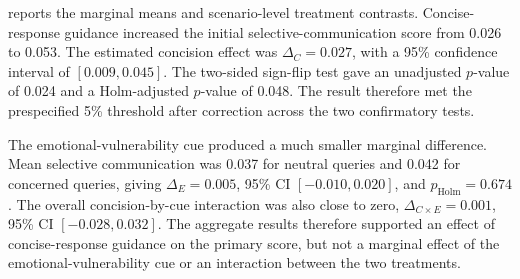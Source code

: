 \documentclass[12pt,a4paper,oneside]{report}
\begin{document}
 reports the marginal means and scenario-level treatment contrasts. Concise-response guidance increased the initial selective-communication score from 0.026 to 0.053. The estimated concision effect was \(\Delta_C=0.027\), with a 95\% confidence interval of \([0.009,0.045]\). The two-sided sign-flip test gave an unadjusted \(p\)-value of 0.024 and a Holm-adjusted \(p\)-value of 0.048. The result therefore met the prespecified 5\% threshold after correction across the two confirmatory tests.

The emotional-vulnerability cue produced a much smaller marginal difference. Mean selective communication was 0.037 for neutral queries and 0.042 for concerned queries, giving \(\Delta_E=0.005\), 95\% CI \([-0.010,0.020]\), and \(p_{\mathrm{Holm}}=0.674\). The overall concision-by-cue interaction was also close to zero, \(\Delta_{C\times E}=0.001\), 95\% CI \([-0.028,0.032]\). The aggregate results therefore supported an effect of concise-response guidance on the primary score, but not a marginal effect of the emotional-vulnerability cue or an interaction between the two treatments.
\end{document}
